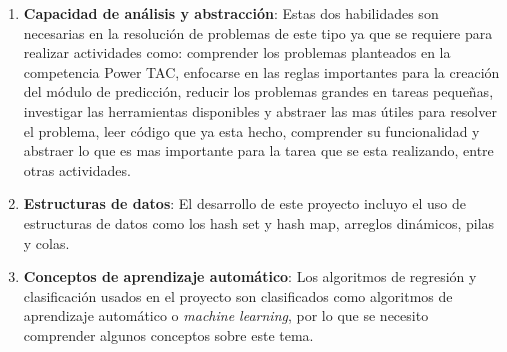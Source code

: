 \begin{enumerate}
	\item \textbf{Capacidad de análisis y abstracción}: Estas dos habilidades son necesarias en la resolución de problemas de este tipo ya que se requiere para realizar actividades como: comprender los problemas planteados en la competencia Power TAC, enfocarse en las reglas importantes para la creación del módulo de predicción, reducir los problemas grandes en tareas pequeñas, investigar las herramientas disponibles y abstraer las mas útiles para resolver el problema, leer código que ya esta hecho, comprender su funcionalidad y abstraer lo que es mas importante para la tarea que se esta realizando, entre otras actividades.
	
	\item \textbf{Estructuras de datos}: El desarrollo de este proyecto incluyo el uso de estructuras de datos como los hash set y hash map, arreglos dinámicos, pilas y colas.
	
	\item \textbf{Conceptos de aprendizaje automático}: Los algoritmos de regresión y clasificación usados en el proyecto son clasificados como algoritmos de aprendizaje automático o \textit{machine learning}, por lo que se necesito comprender algunos conceptos sobre este tema.

\end{enumerate}
